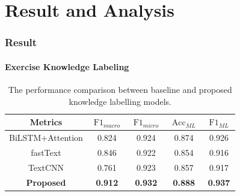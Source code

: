 \documentclass{beamer}
\begin{document}
\section{Result and Analysis}
\begin{frame}
  \frametitle{Result}
  \framesubtitle{Exercise Knowledge Labeling}
  \begin{table}[htbp!]
    \caption{The performance comparison between baseline and proposed knowledge labelling models.}\label{tbl:ch2-result-bsline1}
    \centering
    \begin{tabular}{ccccc}
      \toprule
      Metrics           & \(\operatorname{F1}_{macro}\) & \(\operatorname{F1}_{micro}\) & \(\operatorname{Acc}_{ML}\) & \(\operatorname{F1}_{ML}\) \\
      \midrule
      BiLSTM+Attention  & 0.824                         & 0.924                         & 0.874                       & 0.926                      \\
      fastText          & 0.846                         & 0.922                         & 0.854                       & 0.916                      \\
      TextCNN           & 0.761                         & 0.923                         & 0.857                       & 0.917                      \\
      \textbf{Proposed} & \textbf{0.912}                & \textbf{0.932}                & \textbf{0.888}              & \textbf{0.937}             \\
      \bottomrule
    \end{tabular}
  \end{table}
\end{frame}
\end{document}
